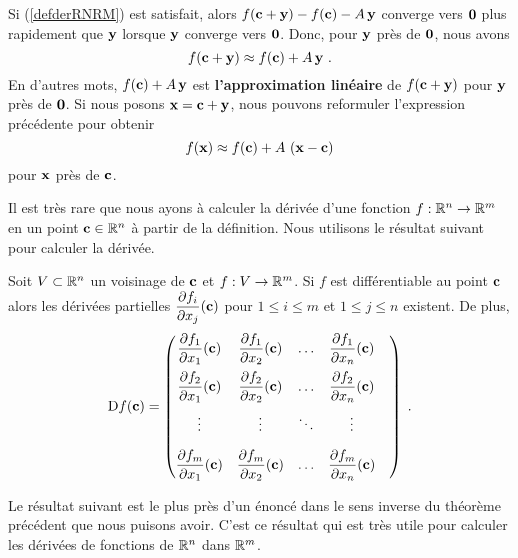 {Si (\ref{defderRNRM}) est satisfait, alors
$f(\mathbf{c}+\mathbf{y})-f(\mathbf{c})- A\,\mathbf{y}$ converge vers $\mathbf{0}$
plus rapidement que $\mathbf{y}$ lorsque $\mathbf{y}$ converge vers
$\mathbf{0}$.  Donc, pour $\mathbf{y}$ près de $\mathbf{0}$, nous avons
\[
  f(\mathbf{c}+\mathbf{y})\approx f(\mathbf{c}) + A\,\mathbf{y} \ .
\]
En d'autres mots, $f(\mathbf{c}) + A\,\mathbf{y}$ est
{\bfseries l'approximation linéaire} de
$f(\mathbf{c}+\mathbf{y})$ pour $\mathbf{y}$ près de $\mathbf{0}$.  Si nous posons
$\mathbf{x} = \mathbf{c} + \mathbf{y}$, nous pouvons reformuler l'expression
précédente pour obtenir
\[
  f(\mathbf{x})\approx f(\mathbf{c}) + A\,\left(\mathbf{x} - \mathbf{c}\right)
\]
pour $\mathbf{x}$ près de $\mathbf{c}$.

Il est très rare que nous ayons à calculer la dérivée d'une fonction
$f:\mathbb{R}^n\rightarrow \mathbb{R}^m$ en un point $\mathbf{c}\in \mathbb{R}^n$ à partir de la
définition.  Nous utilisons le résultat suivant pour calculer la dérivée.

\begin{theorem}
Soit $V\subset \mathbb{R}^n$ un voisinage de $\mathbf{c}$ et $f:V\rightarrow \mathbb{R}^m$.
Si $f$ est différentiable au point $\mathbf{c}$ alors les dérivées partielles
$\displaystyle \frac{\partial f_i}{\partial x_j}(\mathbf{c})$ pour $1\leq i \leq m$ et
$1\leq j \leq n$ existent.  De plus,
\[
\mathrm{D} f(\mathbf{c}) =
\begin{pmatrix}
\displaystyle \frac{\partial f_1}{\partial x_1}(\mathbf{c}) &
\displaystyle \frac{\partial f_1}{\partial x_2}(\mathbf{c}) & \ldots &
\displaystyle \frac{\partial f_1}{\partial x_n}(\mathbf{c}) \\[1em]
\displaystyle \frac{\partial f_2}{\partial x_1}(\mathbf{c}) &
\displaystyle \frac{\partial f_2}{\partial x_2}(\mathbf{c}) & \ldots &
\displaystyle \frac{\partial f_2}{\partial x_n}(\mathbf{c}) \\[1em]
\vdots & \vdots & \ddots & \vdots & \\[1em]
\displaystyle \frac{\partial f_m}{\partial x_1}(\mathbf{c}) &
\displaystyle \frac{\partial f_m}{\partial x_2}(\mathbf{c}) & \ldots &
\displaystyle \frac{\partial f_m}{\partial x_n}(\mathbf{c})
\end{pmatrix} \; .
\]
\end{theorem}

Le résultat suivant est le plus près d'un énoncé dans le sens inverse
du théorème précédent que nous puisons avoir.  C'est ce résultat qui
est très utile pour calculer les dérivées de fonctions de $\mathbb{R}^n$ dans
$\mathbb{R}^m$.

}
